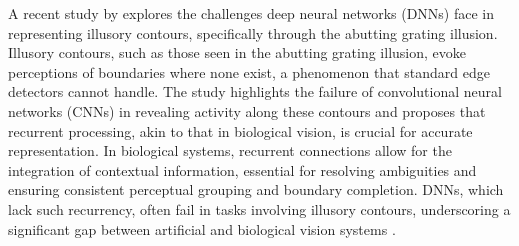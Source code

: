 \documentclass[12pt]{article}
\begin{document}

\bigbreak
A recent study by \textcite{fanChallengingDeepLearning2023} explores the challenges deep neural networks (DNNs) face in representing illusory contours, specifically through the abutting grating illusion. Illusory contours, such as those seen in the abutting grating illusion, evoke perceptions of boundaries where none exist, a phenomenon that standard edge detectors cannot handle. The study highlights the failure of convolutional neural networks (CNNs) in revealing activity along these contours and proposes that recurrent processing, akin to that in biological vision, is crucial for accurate representation. In biological systems, recurrent connections allow for the integration of contextual information, essential for resolving ambiguities and ensuring consistent perceptual grouping and boundary completion. DNNs, which lack such recurrency, often fail in tasks involving illusory contours, underscoring a significant gap between artificial and biological vision systems \autocite{fanChallengingDeepLearning2023}.
\bigbreak
\end{document}
